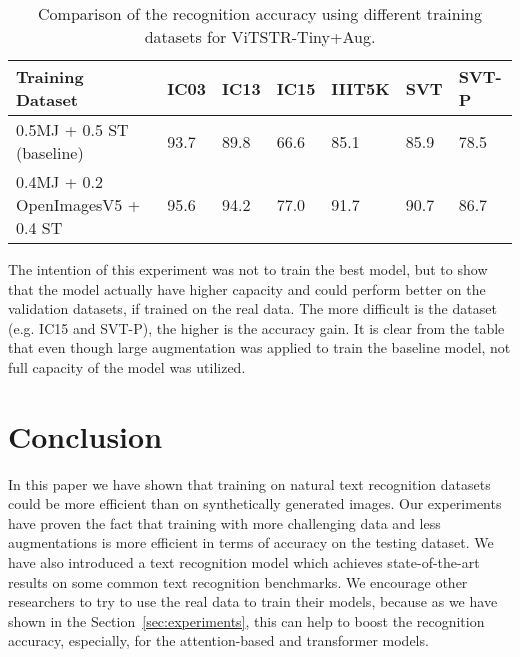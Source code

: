 \documentclass[runningheads]{llncs}
\begin{document}
\begin{table}[ht]
  \centering
  \caption{Comparison of the recognition accuracy using different training datasets for ViTSTR-Tiny+Aug.}
  \begin{tabular}{|l|l|l|l|l|l|l|}
    \hline
    Training Dataset                  & IC03 & IC13 & IC15 & IIIT5K & SVT  & SVT-P \\
    \hline
    0.5MJ + 0.5 ST (baseline)         & 93.7 & 89.8 & 66.6 & 85.1   & 85.9 & 78.5  \\
    0.4MJ + 0.2 OpenImagesV5 + 0.4 ST & 95.6 & 94.2 & 77.0 & 91.7   & 90.7 & 86.7  \\
    \hline
  \end{tabular}

  \label{table:vit}
\end{table}

The intention of this experiment was not to train the best model, but to show
that the model actually have higher capacity and could perform better on the
validation datasets, if trained on the real data. The more difficult is the
dataset (e.g. IC15 and SVT-P), the higher is the accuracy gain. It is clear from the table
that even though large augmentation was applied to train the
baseline model, not full capacity of the model was utilized.

\section{Conclusion}
\label{sec:conclusion}
In this paper we have shown  that training on natural text recognition datasets
could be more efficient than on synthetically generated images. Our experiments have
proven the fact that training with more challenging data and less augmentations is more
efficient in terms of accuracy on the testing dataset. We have also
introduced a text recognition model which achieves state-of-the-art results
on some common text recognition benchmarks. We encourage other researchers to
try to use the real data to train their models, because as we have shown in the
Section~\ref{sec:experiments}, this can help to boost the recognition accuracy,
especially, for the attention-based and transformer models.




\end{document}
